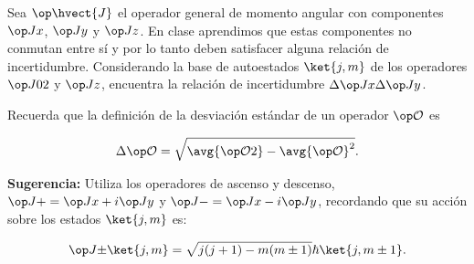 \documentclass[./../main.tex]{subfiles}
\begin{document}
    \color{blue}
    \begin{exercise}
        Sea \(\observable{\hvect{J}}\) el operador general de momento angular con componentes \(\observable{J}[x]\), \(\observable{J}[y]\) y \(\observable{J}[z]\). En clase aprendimos que estas componentes no conmutan entre sí y por lo tanto deben satisfacer alguna relación de incertidumbre. Considerando la base de autoestados \(\ket{j, m}\) de los operadores \(\observable{J}[0][2]\) y \(\observable{J}[z]\), encuentra la relación de incertidumbre \(\change{\observable{J}[x]}\change{\observable{J}[y]}\).

        Recuerda que la definición de la desviación estándar de un operador \(\observable{\mathcal{O}}\) es

        \begin{equation*}
            \change{\observable{\mathcal{O}}} = \sqrt{\avg{\observable{\mathcal{O}}[][2]} - \avg{\observable{\mathcal{O}}}^{2}}.
        \end{equation*}

        \textbf{Sugerencia:} Utiliza los operadores de ascenso y descenso, \(\observable{J}[+] = \observable{J}[x] + i\observable{J}[y]\) y \(\observable{J}[-] = \observable{J}[x] - i\observable{J}[y]\), recordando que su acción sobre los estados \(\ket{j,m}\) es:

        \begin{equation*}
            \observable{J}[\pm]\ket{j,m} = \sqrt{j(j + 1) - m(m \pm 1)}\hbar\ket{j, m \pm 1}.
        \end{equation*}
    \end{exercise}
\end{document}
